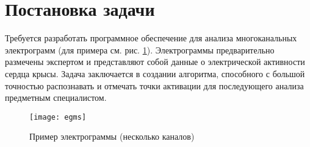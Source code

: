 \section{Постановка задачи}

Требуется разработать программное обеспечение для анализа многоканальных
электрограмм (для примера см. рис. \ref{fig:egms}). Электрограммы
предварительно размечены экспертом и представляют собой данные о электрической
активности сердца крысы. Задача заключается в создании алгоритма, способного с
большой точностью распознавать и отмечать точки активации для последующего
анализа предметным специалистом.

\begin{figure}[!htb]
	\centering
	\caption{Пример электрограммы (несколько каналов)}
	\texttt{[image: egms]}
	\label{fig:egms}
\end{figure}
